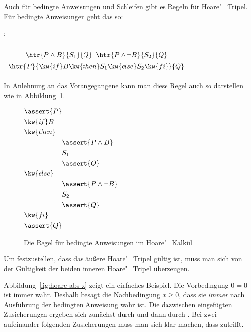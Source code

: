 Auch für bedingte Anweisungen und Schleifen gibt es Regeln für
Hoare"=Tripel.
%
Für bedingte Anweisungen geht das so:

: \quad \begin{tabular}{c}
                $\htr{P \land B}{S_1}{Q}$ \qquad $\htr{P\land \lnot B}{S_2}{Q}$\\
                \midrule
                $\htr{P}{\kw{if } B \kw{ then } S_1 \kw{ else } S_2 \kw{ fi}}{Q}$ 
              \end{tabular}

\noindent 
%
In Anlehnung an das Vorangegangene kann man diese Regel auch so
darstellen wie in Abbildung~\ref{fig:HTI}.
%
\begin{figure}[ht]
  \centering
  $\begin{alignedat}{2}
    &\assert{P}  \\
    &\kw{if } B  \\
    &\kw{then } \\
    &&&\assert{P \land  B} \\
    &&& S_1  \\
    &&&\assert{Q} \\
    &\kw{else } \\
    &&&\assert{P \land  \lnot B} \\
    &&& S_2  \\
    &&&\assert{Q} \\
    &\kw{fi } \\
    &\assert{Q}
  \end{alignedat}$
  \caption{Die Regel  für bedingte Anweisungen im Hoare"=Kalkül}
  \label{fig:HTI}
\end{figure}
%
Um festzustellen, dass das äußere Hoare"=Tripel gültig ist, muss man sich von
der Gültigkeit der beiden inneren Hoare"=Tripel überzeugen.
%

Abbildung~\ref{fig:hoare-abs-x} zeigt ein einfaches Beispiel.
%
Die Vorbedingung $0=0$ ist immer wahr.
%
Deshalb besagt die Nachbedingung $x\geq 0$, dass sie \emph{immer} nach
Ausführung der bedingten Anweisung wahr ist.
%
Die dazwischen eingefügten Zusicherungen ergeben sich zunächst durch
 und dann durch .
%
Bei zwei aufeinander folgenden Zusicherungen muss man sich klar
machen, dass  zutrifft.

